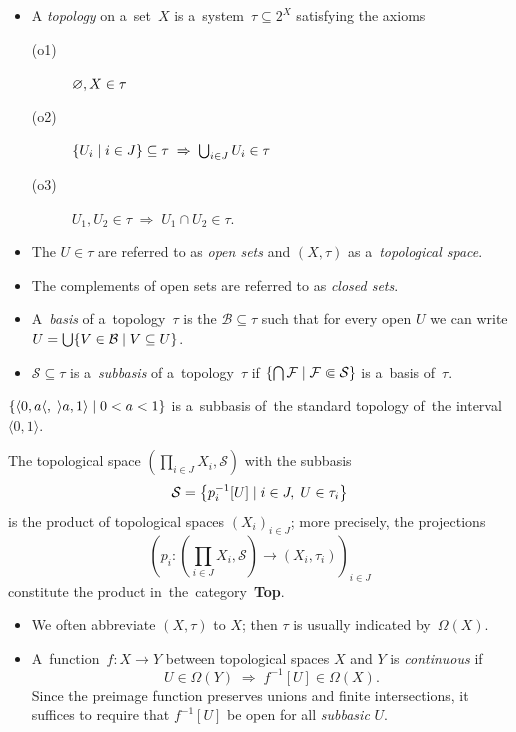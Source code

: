 \begin{itemize}
\item A \emph{topology} on a~set~$X$ is a~system~$\tau\subseteq 2^X$ satisfying
the axioms
  \begin{description}
  \item[(o1)] $\varnothing, X \in \tau$
  \item[(o2)] $\left\{ U_i \mid i\in J \right\} \subseteq \tau \; \Rightarrow \;
  \bigcup_{i\in J} U_i \in \tau$
  \item[(o3)] $U_1, U_2 \in \tau \; \Rightarrow \; U_1 \cap U_2 \in \tau$.
  \end{description}

\item The $U\in \tau$ are referred to as \emph{open sets\/} and $(X, \tau)$ as
a~\emph{topological space\/}.

\item The complements of open sets are referred to as \emph{closed sets\/}.

\item A~\emph{basis} of a~topology~$\tau$ is the $\mathcal{B}\subseteq \tau$
such that for every open $U$ we can write $U = \bigcup \{V\in \mathcal{B} \mid
V\subseteq U \}$.

\item $\mathcal{S}\subseteq \tau$ is a~\emph{subbasis} of a~topology~$\tau$ if
$\left\{ \bigcap \mathcal{F} \mid \mathcal{F} \Subset \mathcal{S} \right\}$ is
a~basis of~$\tau$.
\end{itemize}

\begin{exmpl}
  $\{ \langle 0, a \langle, \; \rangle a, 1 \rangle \mid 0
  < a < 1 \}$ is a~subbasis of~the standard topology of~the interval $\langle
  0, 1\rangle$.
\end{exmpl}

\begin{exmpl}
  The topological space $\left( \prod_{i\in J} X_i, \mathcal{S} \right)$ with
  the subbasis
  \[
    \mathcal{S} = \left\{ p_{i}^{-1}[U] \mid i\in J, \; U\in \tau_i \right\}
  \]
  is the product of topological spaces $\left( X_i \right)_{i\in J}$;
  more precisely, the projections
  \[
    \left( p_i\colon \left(\prod_{i\in J} X_i, \mathcal{S}\right) \to
    \left(X_i, \tau_i\right) \right)_{i\in J}
  \]
  constitute the product in~the~category~{\bf Top}.
\end{exmpl}

\begin{itemize}
\item We often abbreviate $(X, \tau)$ to $X$;
then $\tau$ is usually indicated by~$\Omega(X)$.

\item A~function~$f\colon X \to Y$ between topological spaces $X$ and $Y$ is
\emph{continuous} if 
\[
  U\in \Omega(Y) \; \Longrightarrow \; f^{-1}[U]\in \Omega(X).
\]
Since the preimage function preserves unions and finite intersections, it
suffices to require that $f^{-1}[U]$ be open for all \emph{subbasic\/} $U$.
\end{itemize}

